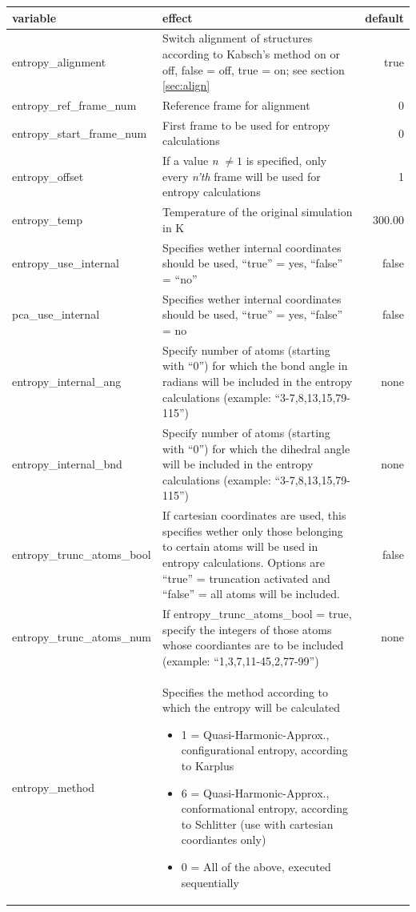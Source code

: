 \documentclass[10pt,a4paper]{article} %
\begin{document}
	\begin{tabularx}{\textwidth}{l|X|r}
		variable & effect & default\\
		\hline
		entropy\_alignment & Switch alignment of structures according to Kabsch's method\cite{kabsch1, kabsch2} on or off, false = off, true = on; see section \ref{sec:align} & true\\
		entropy\_ref\_frame\_num & Reference frame for alignment & 0 \\
		entropy\_start\_frame\_num & First frame to be used for entropy calculations & 0 \\
		entropy\_offset & If a value \textit{n} $\neq 1$ is specified, only every \textit{n'th} frame will be used for entropy calculations & 1 \\
		entropy\_temp & Temperature of the original simulation in K & 300.00 \\
		entropy\_use\_internal & Specifies wether internal coordinates should be used, ``true'' = yes, ``false'' = ``no'' & false \\
		pca\_use\_internal & Specifies wether internal coordinates should be used, ``true'' = yes, ``false'' = no & false \\
		entropy\_internal\_ang & Specify number of atoms (starting with ``0'') for which the bond angle in radians will be included in the entropy calculations (example: ``3-7,8,13,15,79-115'') & none\\
		entropy\_internal\_bnd & Specify number of atoms (starting with ``0'') for which the dihedral angle will be included in the entropy calculations (example: ``3-7,8,13,15,79-115'') & none\\
		entropy\_trunc\_atoms\_bool & If cartesian coordinates are used, this specifies wether only those belonging to certain atoms will be used in entropy calculations. Options are ``true'' = truncation activated and ``false'' = all atoms will be included. & false\\
		entropy\_trunc\_atoms\_num & If entropy\_trunc\_atoms\_bool = true, specify the integers of those atoms whose coordiantes are to be included (example: ``1,3,7,11-45,2,77-99'') & none\\
		entropy\_method & Specifies the method according to which the entropy will be calculated 
		\begin{itemize}
		\item 1 = Quasi-Harmonic-Approx., configurational entropy, according to Karplus\supercite{karplus_entropy}
		\item 6 = Quasi-Harmonic-Approx., conformational entropy, according to Schlitter\supercite{schlitter_entropy} (use with cartesian coordiantes only)
		\item 0 = All of the above, executed sequentially
		\end{itemize}\\
		
	\end{tabularx}
		
\end{document}
